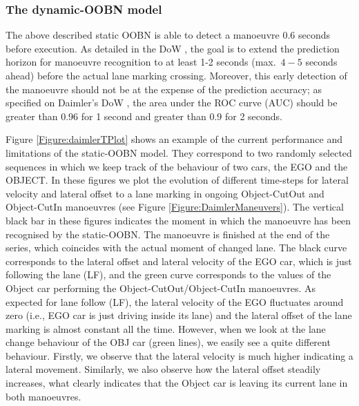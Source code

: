\subsubsection*{The dynamic-OOBN model}

The above described static OOBN is able to detect a manoeuvre $0.6$ seconds before execution. As detailed in the DoW \cite{Fer14}, the goal is to extend the prediction horizon for manoeuvre recognition to at least 1-2 seconds (max.\ $4-5$ seconds ahead) before the actual lane marking crossing. Moreover, this early detection of the manoeuvre should not be at the expense of the prediction accuracy;  as specified on Daimler's DoW \cite{Fer14}, the area under the ROC curve (AUC) should be greater than 0.96 for 1 second and greater than 0.9 for 2 seconds.

Figure \ref{Figure:daimlerTPlot} shows an example of the current performance and limitations of the static-OOBN model. They correspond to two randomly selected sequences in which we keep track of the behaviour of two cars, the EGO and the OBJECT. In these figures we plot the evolution of different time-steps for lateral velocity and lateral offset to a lane marking in ongoing Object-CutOut and Object-CutIn manoeuvres (see Figure \ref{Figure:DaimlerManeuvers}). The vertical black bar in these figures indicates the moment in which the manoeuvre has been recognised by the static-OOBN. The manoeuvre is finished at the end of the series, which coincides with the actual moment of changed lane. The black curve corresponds to the lateral offset and lateral velocity of the EGO car, which is just following the lane (LF), and the green curve corresponds to the values of the Object car performing the Object-CutOut/Object-CutIn manoeuvres. As expected for lane follow (LF), the lateral velocity of the EGO fluctuates around zero  (i.e., EGO car is just driving inside its lane) and the lateral offset of the lane marking is almost constant all the time. However, when we look at the lane change behaviour of the OBJ car (green lines), we easily see a quite different behaviour. Firstly, we observe that the lateral velocity is much  higher indicating a lateral movement. Similarly, we also observe how the lateral offset steadily increases, what clearly indicates that the Object car is leaving its current lane in both manoeuvres. 

